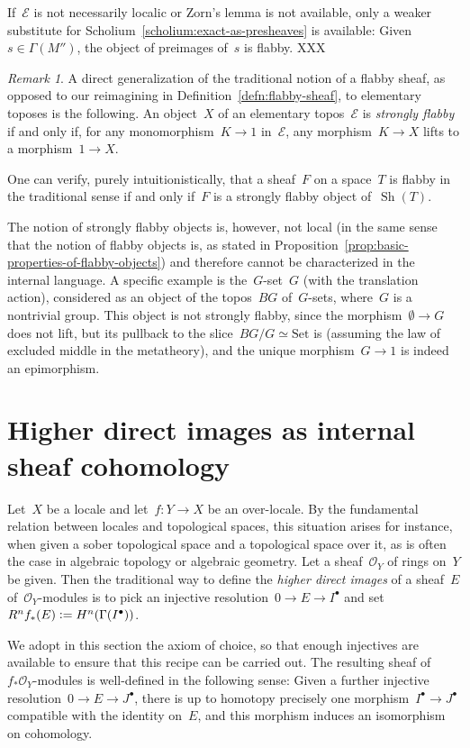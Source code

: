 \documentclass[oneside]{amsart}
\theoremstyle{definition}
\theoremstyle{plain}
\theoremstyle{remark}
\newtheorem{rem}[defn]{Remark}
\newcommand{\E}{\mathcal{E}}
\renewcommand{\O}{\mathcal{O}}
\newcommand{\defeq}{\vcentcolon=}
\DeclareMathOperator{\Sh}{Sh}
\newcommand{\Set}{\mathrm{Set}}
\renewcommand{\_}{\mathpunct{.}\,}
\begin{document}
If~$\E$ is not necessarily localic or Zorn's lemma is not available, only a
weaker substitute for Scholium~\ref{scholium:exact-as-presheaves} is available:
Given~$s \in \Gamma(M'')$, the object of preimages of~$s$ is flabby. XXX

\begin{rem}A direct generalization of the traditional notion of a flabby sheaf, as
opposed to our reimagining in Definition~\ref{defn:flabby-sheaf}, to
elementary toposes is the following. An object~$X$ of an elementary topos~$\E$
is \emph{strongly flabby} if and only if, for any monomorphism~$K \to 1$
in~$\E$, any morphism~$K \to X$ lifts to a morphism~$1 \to X$.

One can verify, purely intuitionistically, that a sheaf~$F$ on a space~$T$ is
flabby in the traditional sense if and only if~$F$ is a strongly flabby object
of~$\Sh(T)$.

The notion of strongly flabby objects is, however, not local (in the same sense
that the notion of flabby objects is, as stated in
Proposition~\ref{prop:basic-properties-of-flabby-objects})
and therefore cannot be characterized in the internal language. A specific
example is the~$G$-set~$G$ (with the translation action), considered as an
object of the topos~$BG$ of~$G$-sets, where~$G$ is a nontrivial group.
This object is not strongly flabby, since the morphism~$\emptyset \to G$ does
not lift, but its pullback to the slice~$BG/G \simeq \Set$ is (assuming
the law of excluded middle in the metatheory), and the unique morphism~$G \to
1$ is indeed an epimorphism.
\end{rem}


\section{Higher direct images as internal sheaf cohomology}

Let~$X$ be a locale and let~$f : Y \to X$ be an over-locale. By the fundamental
relation between locales and topological spaces, this situation arises
for instance, when given a sober topological space and a topological
space over it, as is often the case in algebraic topology or algebraic
geometry. Let a sheaf~$\O_Y$ of rings on~$Y$ be given. Then the
traditional way to define the \emph{higher direct images} of a sheaf~$E$
of~$\O_Y$-modules is to pick an injective resolution~$0 \to E \to I^\bullet$
and set~$R^n f_*(E) \defeq H^n(\Gamma(I^\bullet))$.

We adopt in this section the axiom of choice, so that enough injectives are
available to ensure that this recipe can be carried out. The resulting sheaf
of~$f_*\O_Y$-modules is well-defined in the following sense: Given a further
injective resolution~$0 \to E \to J^\bullet$, there is up to homotopy precisely
one morphism~$I^\bullet \to J^\bullet$ compatible with the identity on~$E$, and
this morphism induces an isomorphism on cohomology.
\end{document}
